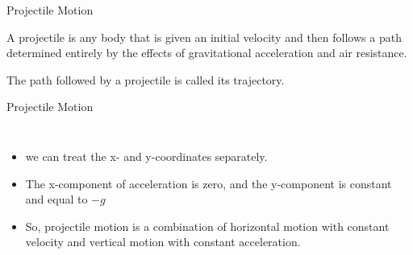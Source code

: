 \documentclass[]{beamer}
\begin{document}
\begin{frame}
    Projectile Motion  
    \vspace{3mm}

    A projectile is any body that is given an initial velocity and then follows a path
    determined entirely by the effects of gravitational acceleration and air resistance.
    \vspace{3mm}

     The path followed by a projectile is
    called its trajectory.

    

          


\end{frame}




\begin{frame}
Projectile Motion  
  \vspace{3mm}

    
      \begin{columns}[c]
          \column{2.3in}  %
         
    \begin{itemize}
        \item we can treat the x- and
        y-coordinates separately.
        \item The x-component of acceleration is zero, and the
        y-component is constant and equal to $-g$
        \item So,  projectile
        motion is a combination of horizontal motion with constant velocity and
        vertical motion with constant acceleration.
    \end{itemize}

  
  
          \column{2.5in}
          

\end{columns}
\end{frame}
\end{document}
